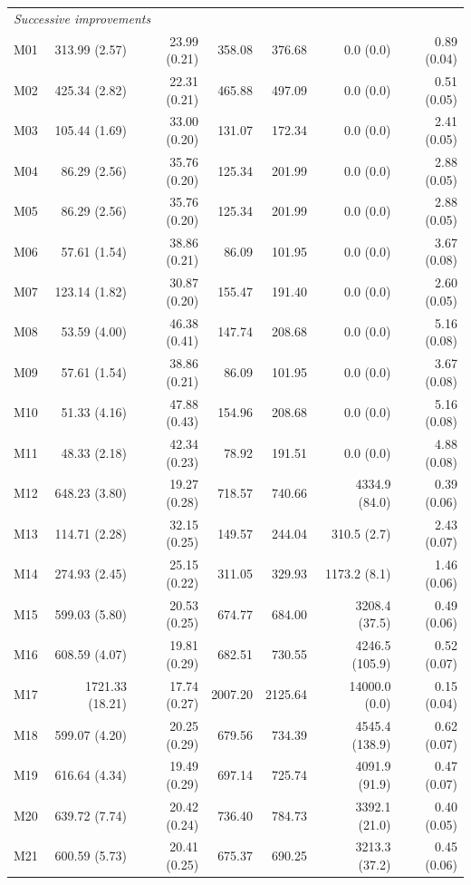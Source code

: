 \documentclass[11pt]{article}
\theoremstyle{remark}
\begin{document}
\begin{longtable}{lrrrrrr}
\multicolumn{7}{l}{\textit{Successive improvements}} \\
M01 & 313.99 (2.57) & 23.99 (0.21) & 358.08 & 376.68 & 0.0 (0.0) & 0.89 (0.04) \\
M02 & 425.34 (2.82) & 22.31 (0.21) & 465.88 & 497.09 & 0.0 (0.0) & 0.51 (0.05) \\
M03 & 105.44 (1.69) & 33.00 (0.20) & 131.07 & 172.34 & 0.0 (0.0) & 2.41 (0.05) \\
M04 & 86.29 (2.56) & 35.76 (0.20) & 125.34 & 201.99 & 0.0 (0.0) & 2.88 (0.05) \\
M05 & 86.29 (2.56) & 35.76 (0.20) & 125.34 & 201.99 & 0.0 (0.0) & 2.88 (0.05) \\
M06 & 57.61 (1.54) & 38.86 (0.21) & 86.09 & 101.95 & 0.0 (0.0) & 3.67 (0.08) \\
M07 & 123.14 (1.82) & 30.87 (0.20) & 155.47 & 191.40 & 0.0 (0.0) & 2.60 (0.05) \\
M08 & 53.59 (4.00) & 46.38 (0.41) & 147.74 & 208.68 & 0.0 (0.0) & 5.16 (0.08) \\
M09 & 57.61 (1.54) & 38.86 (0.21) & 86.09 & 101.95 & 0.0 (0.0) & 3.67 (0.08) \\
M10 & 51.33 (4.16) & 47.88 (0.43) & 154.96 & 208.68 & 0.0 (0.0) & 5.16 (0.08) \\
M11 & 48.33 (2.18) & 42.34 (0.23) & 78.92 & 191.51 & 0.0 (0.0) & 4.88 (0.08) \\
M12 & 648.23 (3.80) & 19.27 (0.28) & 718.57 & 740.66 & 4334.9 (84.0) & 0.39 (0.06) \\
M13 & 114.71 (2.28) & 32.15 (0.25) & 149.57 & 244.04 & 310.5 (2.7) & 2.43 (0.07) \\
M14 & 274.93 (2.45) & 25.15 (0.22) & 311.05 & 329.93 & 1173.2 (8.1) & 1.46 (0.06) \\
M15 & 599.03 (5.80) & 20.53 (0.25) & 674.77 & 684.00 & 3208.4 (37.5) & 0.49 (0.06) \\
M16 & 608.59 (4.07) & 19.81 (0.29) & 682.51 & 730.55 & 4246.5 (105.9) & 0.52 (0.07) \\
M17 & 1721.33 (18.21) & 17.74 (0.27) & 2007.20 & 2125.64 & 14000.0 (0.0) & 0.15 (0.04) \\
M18 & 599.07 (4.20) & 20.25 (0.29) & 679.56 & 734.39 & 4545.4 (138.9) & 0.62 (0.07) \\
M19 & 616.64 (4.34) & 19.49 (0.29) & 697.14 & 725.74 & 4091.9 (91.9) & 0.47 (0.07) \\
M20 & 639.72 (7.74) & 20.42 (0.24) & 736.40 & 784.73 & 3392.1 (21.0) & 0.40 (0.05) \\
M21 & 600.59 (5.73) & 20.41 (0.25) & 675.37 & 690.25 & 3213.3 (37.2) & 0.45 (0.06) \\

\end{longtable}
\end{document}
